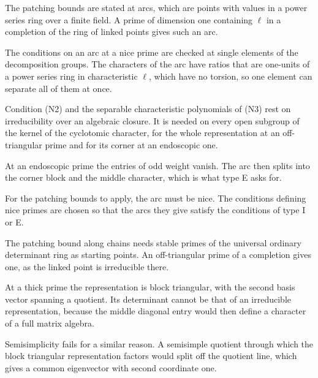 The patching bounds are stated at arcs, which are points with values in a power series ring over a finite field. A prime of dimension one containing $\ell$ in a completion of the ring of linked points gives such an arc.

The conditions on an arc at a nice prime are checked at single elements of the decomposition groups. The characters of the arc have ratios that are one-units of a power series ring in characteristic $\ell$, which have no torsion, so one element can separate all of them at once.

Condition (N2) and the separable characteristic polynomials of (N3) rest on irreducibility over an algebraic closure. It is needed on every open subgroup of the kernel of the cyclotomic character, for the whole representation at an off-triangular prime and for its corner at an endoscopic one.

At an endoscopic prime the entries of odd weight vanish. The arc then splits into the corner block and the middle character, which is what type E asks for.

For the patching bounds to apply, the arc must be nice. The conditions defining nice primes are chosen so that the arcs they give satisfy the conditions of type I or E.

The patching bound along chains needs stable primes of the universal ordinary determinant ring as starting points. An off-triangular prime of a completion gives one, as the linked point is irreducible there.

At a thick prime the representation is block triangular, with the second basis vector spanning a quotient. Its determinant cannot be that of an irreducible representation, because the middle diagonal entry would then define a character of a full matrix algebra.

Semisimplicity fails for a similar reason. A semisimple quotient through which the block triangular representation factors would split off the quotient line, which gives a common eigenvector with second coordinate one.

